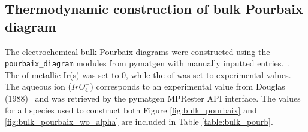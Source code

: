 







\subsection{Thermodynamic construction of bulk Pourbaix diagram}
%
%
The electrochemical bulk Pourbaix diagrams were constructed using the \texttt{pourbaix\_diagram} modules from pymatgen with manually inputted entries.~\cite{Ong2013}.
%
The \DGf of metallic Ir(s) was set to 0, while the \DGf of \rIrOtwo was set to experimental values.~\cite{Barin1995}
%
The aqueous ion ($IrO_{4}^{-}$) corresponds to an experimental value from Douglas (1988)~\cite{Adams1988} and was retrieved by the pymatgen MPRester API interface.
%
The \DGf values for all species used to construct both Figure \ref{fig:bulk_pourbaix} and \ref{fig:bulk_pourbaix_wo_alpha} are included in Table \ref{table:bulk_pourb}.



\begin{table}
\centering
\caption{\label{table:bulk_pourb}
%
Enthalpy (\DHf) and free energies (\DGf) of formation per formula unit (f.u.) for the species that make up the bulk Pourbaix diagrams
(see Figures \ref{fig:bulk_pourbaix} and \ref{fig:bulk_pourbaix_wo_alpha}).
%
The Ir metal reference is fitted such that the experimental \DHf of \rIrOtwo is reproduced.~\cite{Barin1995}
%
The $IrO_{4}^{-}$ ion species energy is taken from Douglas (1988)~\cite{Adams1988}.
}

\end{table}


